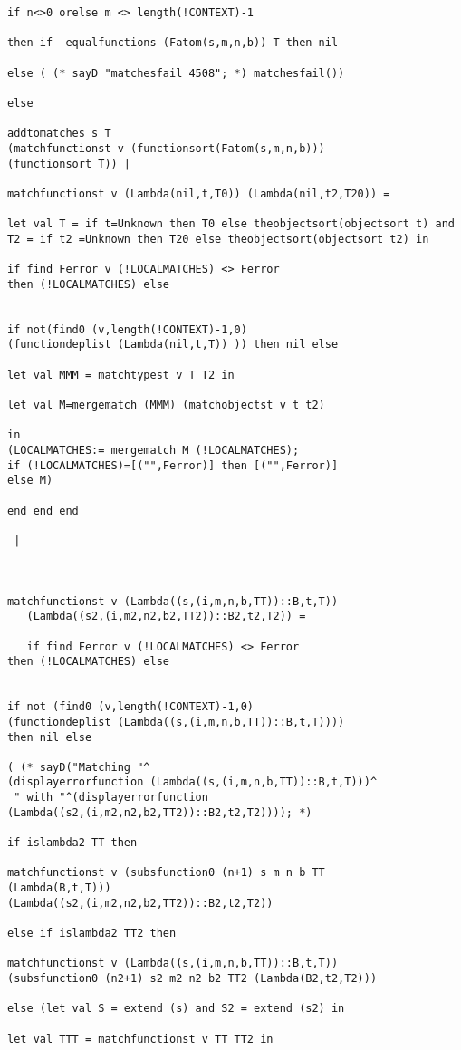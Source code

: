 \documentclass[12pt]{article}
\begin{document}
\begin{verbatim}
if n<>0 orelse m <> length(!CONTEXT)-1

then if  equalfunctions (Fatom(s,m,n,b)) T then nil

else ( (* sayD "matchesfail 4508"; *) matchesfail())

else 

addtomatches s T 
(matchfunctionst v (functionsort(Fatom(s,m,n,b))) 
(functionsort T)) |

matchfunctionst v (Lambda(nil,t,T0)) (Lambda(nil,t2,T20)) =

let val T = if t=Unknown then T0 else theobjectsort(objectsort t) and
T2 = if t2 =Unknown then T20 else theobjectsort(objectsort t2) in

if find Ferror v (!LOCALMATCHES) <> Ferror 
then (!LOCALMATCHES) else


if not(find0 (v,length(!CONTEXT)-1,0) 
(functiondeplist (Lambda(nil,t,T)) )) then nil else

let val MMM = matchtypest v T T2 in

let val M=mergematch (MMM) (matchobjectst v t t2)

in
(LOCALMATCHES:= mergematch M (!LOCALMATCHES);
if (!LOCALMATCHES)=[("",Ferror)] then [("",Ferror)]
else M)

end end end

 |
 
 

matchfunctionst v (Lambda((s,(i,m,n,b,TT))::B,t,T))
   (Lambda((s2,(i,m2,n2,b2,TT2))::B2,t2,T2)) =
   
   if find Ferror v (!LOCALMATCHES) <> Ferror 
then (!LOCALMATCHES) else

   
if not (find0 (v,length(!CONTEXT)-1,0) 
(functiondeplist (Lambda((s,(i,m,n,b,TT))::B,t,T)))) 
then nil else

( (* sayD("Matching "^
(displayerrorfunction (Lambda((s,(i,m,n,b,TT))::B,t,T)))^
 " with "^(displayerrorfunction 
(Lambda((s2,(i,m2,n2,b2,TT2))::B2,t2,T2)))); *)

if islambda2 TT then

matchfunctionst v (subsfunction0 (n+1) s m n b TT 
(Lambda(B,t,T)))
(Lambda((s2,(i,m2,n2,b2,TT2))::B2,t2,T2))

else if islambda2 TT2 then

matchfunctionst v (Lambda((s,(i,m,n,b,TT))::B,t,T)) 
(subsfunction0 (n2+1) s2 m2 n2 b2 TT2 (Lambda(B2,t2,T2)))

else (let val S = extend (s) and S2 = extend (s2) in

let val TTT = matchfunctionst v TT TT2 in


\end{verbatim}
\end{document}
